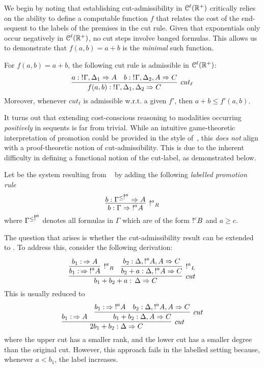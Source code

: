 
We begin by noting that establishing cut-admissibility in $\mathcal{C}^\ell(\mathbb{R}^+)$ critically relies on the ability to define a computable function $f$ that relates the cost of the end-sequent to the labels of the premises in the cut rule.
%
Given that exponentials only occur negatively in $\mathcal{C}^\ell(\mathbb{R}^+)$, no cut steps involve banged formulas. This allows us to demonstrate that $f(a,b) = a + b$ is the {\em minimal} such function.
\begin{theorem}\label{thm:cutAdm}
For $f(a,b)=a+b$, the following cut rule is admissible in $\mathcal{C}^\ell(\mathbb{R}^+)$:
$$
\infer[cut_\ell]{f(a,b): \nbang{}\Gamma,\Delta_1,\Delta_2\seq C}
	{a: \nbang{}\Gamma,\Delta_1\seq A &
	b:\nbang{}\Gamma,\Delta_2,A\seq C
	}
$$
Moreover, whenever $cut_\ell$ is admissible w.r.t. a given $f'$, then $a+b\leq f'(a,b)$.
\end{theorem}
It turns out that extending cost-conscious reasoning to modalities occurring {\em positively} in sequents is far from trivial. 
%
While an intuitive game-theoretic interpretation of promotion could be provided in the style of~\cite{DBLP:conf/tableaux/FermullerL17}, this {\em does not} align with a proof-theoretic notion of cut-admissibility. This is due to the inherent difficulty in defining a functional notion of the cut-label, as demonstrated below.

Let  
\laSELLR  be the system resulting from \laIMALLR~ by 
adding the following \emph{labelled promotion rule}
$$
\infer[\nbang{a}_R]{b:\Gamma\seq \nbang{a} A}{b:\Gamma^{\leqn{a}}\seq A}
$$
where $\Gamma^{\leq \hbox{$\mathop{!}^{a}$}{}}$ denotes all formulas in $\Gamma$ which are of the form $\hbox{$\mathop{!}^{c}$} B$  and $a \geq c$. 

The question that arises is whether the cut-admissibility result can be extended to \laSELLR.
%
To address this, consider the following derivation:
$$
\infer[cut]{b_1+b_2+a:\,\Delta\seq C}
	{\infer[\nbang{a}_R]{b_1:\,\seq \nbang{a} A}{\deduce{b_1:\,\seq A}{}}
	&
	\infer[\nbang{a}_L]{b_2+a:\Delta,\nbang{a}A\seq C}
		{\deduce{b_2:\Delta,\nbang{a}A,A\seq C}{}}
	}
$$
This is usually reduced to
$$
\infer[cut]{2b_1+b_2:\Delta\seq C}
	{\deduce{b_1:\,\seq A}{} &
	\infer[cut]{b_1+b_2:\Delta,A\seq C}
	 	{\deduce{b_1:\,\seq \nbang{a} A}{} &
	 	\deduce{b_2:\Delta,\nbang{a}A,A\seq C}{}
	 	}
	}
$$
where the upper cut has a smaller rank, and the lower cut has a smaller degree than the original cut. However, this approach fails in the labelled setting because, whenever $a < b_1$, the label increases.

